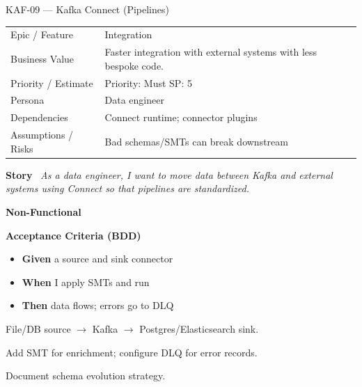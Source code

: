 \documentclass[11pt,a4paper]{article}
\newcommand{\Field}[2]{\textbf{#1}~#2}
\begin{document}
\begin{StoryCardBox}{KAF-09 --- Kafka Connect (Pipelines)}
\begin{tabularx}{\linewidth}{LY}
 Epic / Feature & Integration \\
 Business Value & Faster integration with external systems with less bespoke code. \\
 Priority / Estimate & Priority: Must \quad SP: 5 \\
 Persona & Data engineer \\
 Dependencies & Connect runtime; connector plugins \\
 Assumptions / Risks & Bad schemas/SMTs can break downstream \\
\end{tabularx}

\medskip
\Field{Story}{\; \emph{As a data engineer, I want to move data between Kafka and external systems using Connect so that pipelines are standardized.}}

\medskip
\Field{Non-Functional}{\; \; }

\medskip
\Field{Acceptance Criteria (BDD)}{}
\begin{itemize}[leftmargin=1.2em, itemsep=1pt]
  \item \textbf{Given} a source and sink connector
  \item \textbf{When} I apply SMTs and run
  \item \textbf{Then} data flows; errors go to DLQ
\end{itemize}

\begin{TasksBox}
\begin{tasklist}
  \item File/DB source $\rightarrow$ Kafka $\rightarrow$ Postgres/Elasticsearch sink.
  \item Add SMT for enrichment; configure DLQ for error records.
  \item Document schema evolution strategy.
\end{tasklist}
\end{TasksBox}
\end{StoryCardBox}
\clearpage
\end{document}
